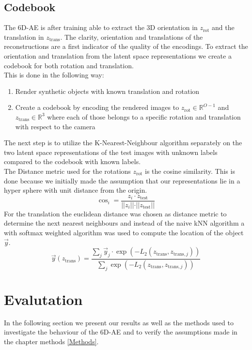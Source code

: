 \documentclass[10pt,a4paper]{article}
\newcommand{\rot}{\ensuremath{\text{rot}\xspace}}
\newcommand{\trans}{\ensuremath{\text{trans}\xspace}}
\begin{document}
\subsection{Codebook}\label{Codebook}
The 6D-AE is after training able to extract the 3D orientation in $z_{\rot}$ and the translation in $z_{\trans}$. The clarity, orientation and translations of the reconstructions are a first indicator of the quality of the encodings. To extract the orientation and translation from the latent space representations we create a codebook for both rotation and translation.\\
This is done in the following way:
\begin{enumerate}
\item Render synthetic objects with known translation and rotation\\
\item Create a codebook by encoding the rendered images to $z_{\rot}\in \mathbb{R}^{O-1}$ and $z_{\trans} \in \mathbb{R}^3$ where each of those belongs to a specific rotation and translation with respect to the camera
\end{enumerate}
The next step is to utilize the K-Nearest-Neighbour algorithm separately on the two latent space representations of the test images with unknown labels compared to the codebook with known labels.\\
The Distance metric used for the rotations $z_{\rot}$ is the cosine similarity. This is done because we initially made the assumption that our representations lie in a hyper sphere with unit distance from the origin.
\begin{equation}
\cos_i = \dfrac{z_i \cdot z_{\text{test}}}{ \vert\vert  z_i \vert \vert \cdot \vert \vert z_{\text{test}} \vert \vert }
\end{equation}
For the translation the euclidean distance was chosen as distance metric to determine the next nearest neighbours and instead of the naive kNN algorithm a with softmax weighted algorithm was used to compute the location of the object $\vec{y}$. 
\begin{equation}
\vec{y}(z_{\trans}) = \dfrac{\sum_j  \vec{y}_j  \cdot  \exp(- L_2(z_{\trans},z_{\trans , j})) }{\sum_j \exp(- L_2(z_{\trans},z_{\trans , j}))}
\end{equation}



\newpage
\section{Evalutation}\label{Evaluation}
In the following section we present our results as well as the methods used to investigate the behaviour of the 6D-AE and to verify the assumptions made in the chapter methods \ref{Methods}.
\end{document}

